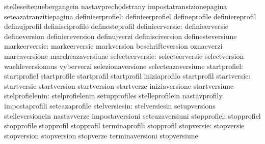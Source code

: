                                   stelleseitenuebergangein         nastavprechodstrany
                                  impostatransizionepagina         seteazatranzitiepagina
                definieerprofiel: definieerprofiel                 defineprofile
                                  definiereprofil                  definujprofil
                                  definisciprofilo                 definesteprofil
                 definieerversie: definieerversie                  defineversion
                                  definiereversion                 definujverzi
                                  definisciversion                 definesteversiune
                   markeerversie: markeerversie                    markversion
                                  beschrifteversion                oznacverzi
                                  marcaversione                    marcheazaversiune %
                 selecteerversie: selecteerversie                  selectversion
                                  waehleversionaus                 vyberverzi
                                  selezionaversione                selecteazaversiune %
                    startprofiel: startprofiel                     startprofile
                                  startprofil                      startprofil
                                  iniziaprofilo                    startprofil
                     startversie: startversie                      startversion
                                  startversion                     startverze
                                  iniziaversione                   startversiune
                 stelprofielenin: stelprofielenin                  setupprofiles
                                  stelleprofilein                  nastavprofily
                                  impostaprofili                   seteazaprofile
                   stelversiesin: stelversiesin                    setupversions
                                  stelleversionein                 nastavverze
                                  impostaversioni                  seteazaversiuni
                     stopprofiel: stopprofiel                      stopprofile
                                  stopprofil                       stopprofil
                                  terminaprofili                   stopprofil
                      stopversie: stopversie                       stopversion
                                  stopversion                      stopverze
                                  terminaversioni                  stopversiune
